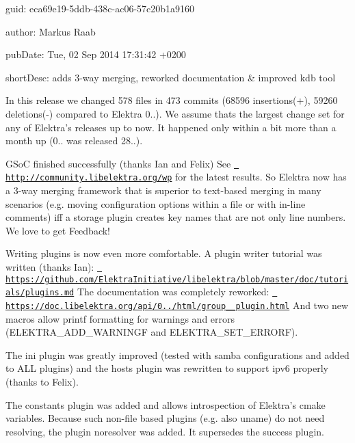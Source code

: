 
\begin{DoxyItemize}
\item guid\+: eca69e19-\/5ddb-\/438c-\/ac06-\/57c20b1a9160
\item author\+: Markus Raab
\item pub\+Date\+: Tue, 02 Sep 2014 17\+:31\+:42 +0200
\item short\+Desc\+: adds 3-\/way merging, reworked documentation \& improved kdb tool
\end{DoxyItemize}

In this release we changed 578 files in 473 commits (68596 insertions(+), 59260 deletions(-\/) compared to Elektra 0..). We assume thats the largest change set for any of Elektra’s releases up to now. It happened only within a bit more than a month up (0.. was released 28..).

G\+SoC finished successfully (thanks Ian and Felix) See \href{http://community.libelektra.org/wp}{\texttt{ http\+://community.\+libelektra.\+org/wp}} for the latest results. So Elektra now has a 3-\/way merging framework that is superior to text-\/based merging in many scenarios (e.\+g. moving configuration options within a file or with in-\/line comments) iff a storage plugin creates key names that are not only line numbers. We love to get Feedback!

Writing plugins is now even more comfortable. A plugin writer tutorial was written (thanks Ian)\+: \href{https://github.com/ElektraInitiative/libelektra/blob/master/doc/tutorials/plugins.md}{\texttt{ https\+://github.\+com/\+Elektra\+Initiative/libelektra/blob/master/doc/tutorials/plugins.\+md}} The documentation was completely reworked\+: \href{https://doc.libelektra.org/api/0.8.7/html/group__plugin.html}{\texttt{ https\+://doc.\+libelektra.\+org/api/0../html/group\+\_\+\+\_\+plugin.\+html}} And two new macros allow printf formatting for warnings and errors ({\ttfamily E\+L\+E\+K\+T\+R\+A\+\_\+\+A\+D\+D\+\_\+\+W\+A\+R\+N\+I\+N\+GF} and {\ttfamily E\+L\+E\+K\+T\+R\+A\+\_\+\+S\+E\+T\+\_\+\+E\+R\+R\+O\+RF}).

The ini plugin was greatly improved (tested with samba configurations and added to A\+LL plugins) and the hosts plugin was rewritten to support ipv6 properly (thanks to Felix).

The constants plugin was added and allows introspection of Elektra’s cmake variables. Because such non-\/file based plugins (e.\+g. also uname) do not need resolving, the plugin noresolver was added. It supersedes the success plugin.

